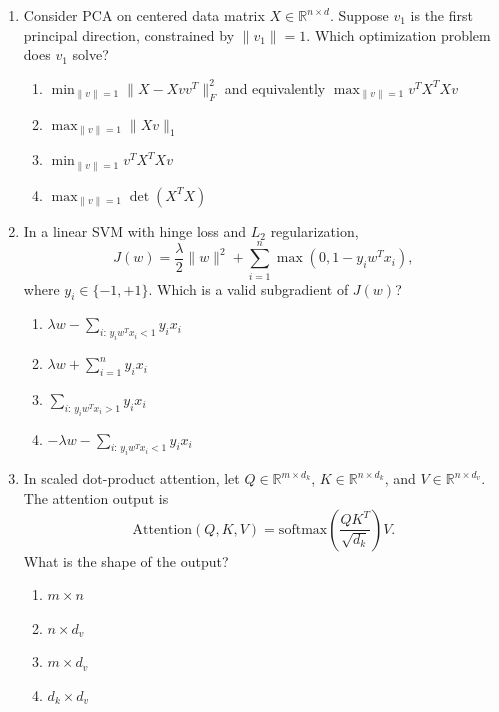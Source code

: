 \documentclass[11pt]{article}
\newcommand{\cmark}{\ding{51}}
\begin{document}
\begin{enumerate}[leftmargin=*]
\item Consider PCA on centered data matrix $X \in \mathbb{R}^{n\times d}$. Suppose $v_1$ is the first principal direction, constrained by $\|v_1\|=1$. Which optimization problem does $v_1$ solve?

\begin{enumerate}[label=\Alph*.]
    \item \(\displaystyle \min_{\|v\|=1} \|X - Xvv^T\|_F^2\) and equivalently \(\max_{\|v\|=1} v^T X^T X v\) \cmark
    \item \(\displaystyle \max_{\|v\|=1} \|Xv\|_1\)
    \item \(\displaystyle \min_{\|v\|=1} v^T X^T X v\)
    \item \(\displaystyle \max_{\|v\|=1} \det(X^T X)\)
\end{enumerate}

\item In a linear SVM with hinge loss and $L_2$ regularization,
\[
J(w)=\frac{\lambda}{2}\|w\|^2 + \sum_{i=1}^n \max(0,1-y_i w^T x_i),
\]
where $y_i \in \{-1,+1\}$. Which is a valid subgradient of $J(w)$?

\begin{enumerate}[label=\Alph*.]
    \item \(\displaystyle \lambda w - \sum_{i:\, y_i w^T x_i < 1} y_i x_i\) \cmark
    \item \(\displaystyle \lambda w + \sum_{i=1}^n y_i x_i\)
    \item \(\displaystyle \sum_{i:\, y_i w^T x_i > 1} y_i x_i\)
    \item \(\displaystyle -\lambda w - \sum_{i:\, y_i w^T x_i < 1} y_i x_i\)
\end{enumerate}

\item In scaled dot-product attention, let $Q \in \mathbb{R}^{m \times d_k}$, $K \in \mathbb{R}^{n \times d_k}$, and $V \in \mathbb{R}^{n \times d_v}$. The attention output is
\[
\mathrm{Attention}(Q,K,V)=\mathrm{softmax}\left(\frac{QK^T}{\sqrt{d_k}}\right)V.
\]
What is the shape of the output?

\begin{enumerate}[label=\Alph*.]
    \item $m \times n$
    \item $n \times d_v$
    \item $m \times d_v$ \cmark
    \item $d_k \times d_v$
\end{enumerate}



\end{enumerate}
\end{document}

